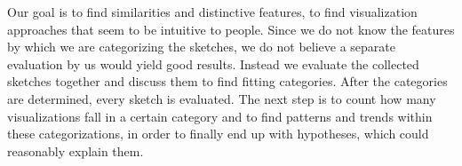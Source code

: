 Our goal is to find similarities and distinctive features, to find visualization approaches that seem to be intuitive to people. Since we do not know the features by which we are categorizing the sketches, we do not believe a separate evaluation by us would yield good results. Instead we evaluate the collected sketches together and discuss them to find fitting categories. After the categories are determined, every sketch is evaluated. The next step is to count how many visualizations fall in a certain category and to find patterns and trends within these categorizations, in order to finally end up with hypotheses, which could reasonably explain them. \par \medskip










